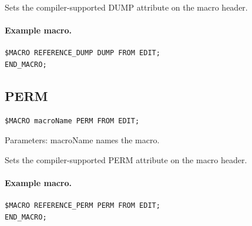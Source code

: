 \documentclass[a4paper,10pt,twoside,openany]{book}
\begin{document}
Sets the compiler-supported DUMP attribute on the macro header.

\paragraph{Example macro.}
\begin{verbatim}
$MACRO REFERENCE_DUMP DUMP FROM EDIT;
END_MACRO;
\end{verbatim}

\label{prim:keyword-perm}
\subsection*{PERM}
\begin{verbatim}
$MACRO macroName PERM FROM EDIT;
\end{verbatim}
Parameters: macroName names the macro.

Sets the compiler-supported PERM attribute on the macro header.

\paragraph{Example macro.}
\begin{verbatim}
$MACRO REFERENCE_PERM PERM FROM EDIT;
END_MACRO;
\end{verbatim}
\end{document}
